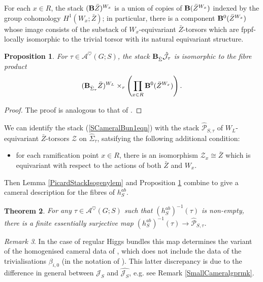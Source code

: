 \documentclass{amsart}
\newtheorem{theorem}{Theorem}
\newtheorem{proposition}[theorem]{Proposition}
\theoremstyle{remark}
\newtheorem{remark}[theorem]{Remark}
\numberwithin{theorem}{section}
\numberwithin{equation}{section}
\begin{document}
For each $x \in R$, the stack $({\bf B}\bar{Z})^{W_x}$ is a union of copies of ${\bf B}(\bar{Z}^{W_x})$ indexed by the group cohomology $H^1(W_x;\bar{Z})$; in particular, there is a component ${\bf B}^0(\bar{Z}^{W_x})$ whose image consists of the substack of $W_x$-equivariant $\bar{Z}$-torsors which are fppf-locally isomorphic to the trivial torsor with its natural equivariant structure.

\begin{proposition}\label{SCameralBunprp}
    For $\tau \in \mathcal A^\heartsuit(G;S)$, the stack ${\bf B}_{\hat\Sigma}\hat{\mathcal J}_\tau$ is isomorphic to the fibre product 
    \begin{equation}\label{SCameralBun1eqn}
        ({\bf B}_{\hat\Sigma_\tau} \bar{Z})^{W_L} \times_r \left(\prod_{x\in R} {\bf B}^0(\bar{Z}^{W_x})\right).
    \end{equation}
\end{proposition}

\begin{proof}
The proof is analogous to that of \cite[Proposition 16.4]{DG}.
\end{proof}

We can identify the stack (\ref{SCameralBun1eqn}) with the stack $\hat{\mathcal P}_{S,\tau}$ of $W_L$-equivariant $\bar{Z}$-torsors $\mathcal Z$ on $\hat\Sigma_\tau$, satsifying the following additional condition:
\begin{itemize}
    \item[$(*)$] for each ramification point $x \in R$, there is an isomorphism $\mathcal Z_x\cong \bar{Z}$ which is equivariant with respect to the actions of both $\bar{Z}$ and $W_x$.
\end{itemize}
Then Lemma \ref{PicardStackIsogenylem} and Proposition \ref{SCameralBunprp} combine to give a cameral description for the fibres of $h_S^{ab}$.

\begin{theorem}\label{SCameralDatathm}
    For any $\tau \in \mathcal A^\heartsuit(G;S)$ such that $(h_S^{ab})^{-1}(\tau)$ is non-empty, there is a finite essentially surjective map $(h_S^{ab})^{-1}(\tau) \rightarrow \hat{\mathcal P}_{S,\tau}$.
\end{theorem}

\begin{remark}\label{SCameralBunrmk}
    In the case of regular Higgs bundles this map determines the variant of the homogenised cameral data of \cite[16.7]{DG}, which does not include the data of the trivialisations $\beta_{i,0}$ (in the notation of \cite[16.3]{DG}). This latter discrepancy is due to the difference in general between $\mathcal J_S$ and $\hat{\mathcal J_S}$, e.g. see Remark \ref{SmallCameralgprmk}.
\end{remark}
\end{document}
